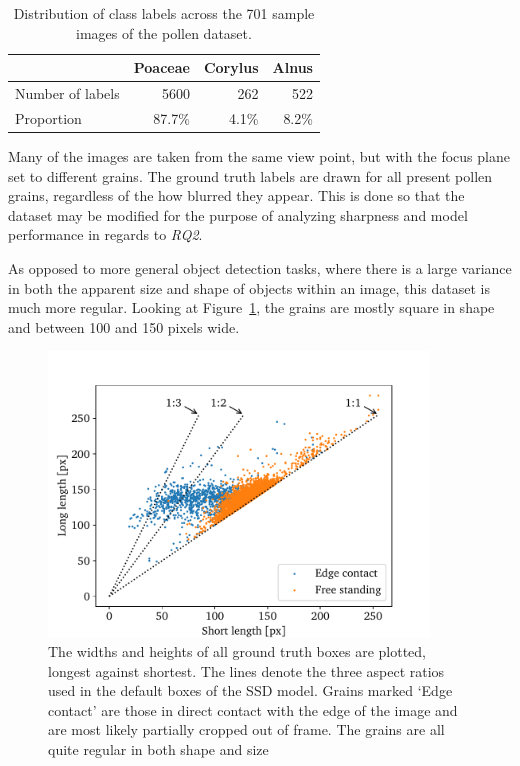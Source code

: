 \begin{table}[htb]
  \caption[Class distribution across the dataset]{Distribution of class labels across the 701 sample images of the pollen dataset.}\label{tab:dataset}
  \centering
  \begin{tabular}{lrrr} \toprule
                      & Poaceae & Corylus & Alnus \\ \midrule
    Number of labels  & 5600    & 262     & 522 \\
    Proportion        & 87.7\%  & 4.1\%   & 8.2\% \\ \bottomrule
  \end{tabular}
\end{table}

Many of the images are taken from the same view point, but with the focus plane set to different grains.
The ground truth labels are drawn for all present pollen grains, regardless of the how blurred they appear.
This is done so that the dataset may be modified for the purpose of analyzing sharpness and model performance in regards to \textit{RQ2}.

As opposed to more general object detection tasks, where there is a large variance in both the apparent size and shape of objects within an image, this dataset is much more regular.
Looking at Figure~\ref{fig:aspect}, the grains are mostly square in shape and between 100 and 150 pixels wide.

\begin{figure}[htb]
  \centering
  \includegraphics[width=0.9\textwidth]{figs/method/aspect_ratio.pdf}
  \caption[Aspect ratios in the dataset]{The widths and heights of all ground truth boxes are plotted, longest against shortest.
The lines denote the three aspect ratios used in the default boxes of the SSD model.
Grains marked `Edge contact' are those in direct contact with the edge of the image and are most likely partially cropped out of frame.
The grains are all quite regular in both shape and size}\label{fig:aspect}
\end{figure}

